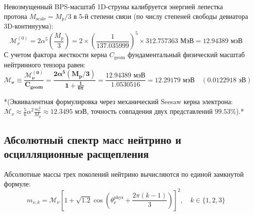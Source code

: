 \documentclass[12pt,a4paper]{article}
\begin{document}
	Невозмущенный BPS-масштаб 1D-струны калибруется энергией лепестка протона $M_{\text{scale}} = M_p/3$ в 5-й степени связи (по числу степеней свободы девиатора 3D-континуума):
	\begin{equation}
		\mathcal{M}_\nu^{(0)} = 2 \alpha^5 \left( \frac{M_p}{3} \right) = 2 \times \left(\frac{1}{137.035999}\right)^5 \times 312.757363 \text{ МэВ} = \mathbf{12.94389 \text{ мэВ}}
	\end{equation}
	С учетом фактора жесткости керна $C_{\text{geom}}$ фундаментальный физический масштаб нейтринного тензора равен:
	\begin{equation}
		\mathbf{\mathcal{M}_\nu \equiv \frac{\mathcal{M}_\nu^{(0)}}{C_{\text{geom}}} = \frac{2 \alpha^5 (M_p / 3)}{1 + \frac{1}{6\pi}} = \frac{12.94389 \text{ мэВ}}{1.0530516} = \mathbf{12.29179 \text{ мэВ}}} \quad (0.0122918 \text{ эВ})
	\end{equation}
	
	*(Эквивалентная формулировка через механический Seesaw керна электрона: $\mathcal{M}_\nu \approx \frac{5}{6} \alpha^2 \frac{m_e^2}{M_p} \approx 12.3495$ мэВ, точность совпадения двух представлений $99.53\%$).*
	
	\subsection{Абсолютный спектр масс нейтрино и осцилляционные расщепления}
	Абсолютные массы трех поколений нейтрино вычисляются по единой замкнутой формуле:
	\begin{equation}
		m_{\nu, k} = \mathcal{M}_\nu \left[ 1 + \sqrt{1.2} \cos\left( \theta_\nu^{\text{phys}} + \frac{2\pi(k-1)}{3} \right) \right]^2, \quad k \in \{1, 2, 3\}
	\end{equation}
	
\end{document}
